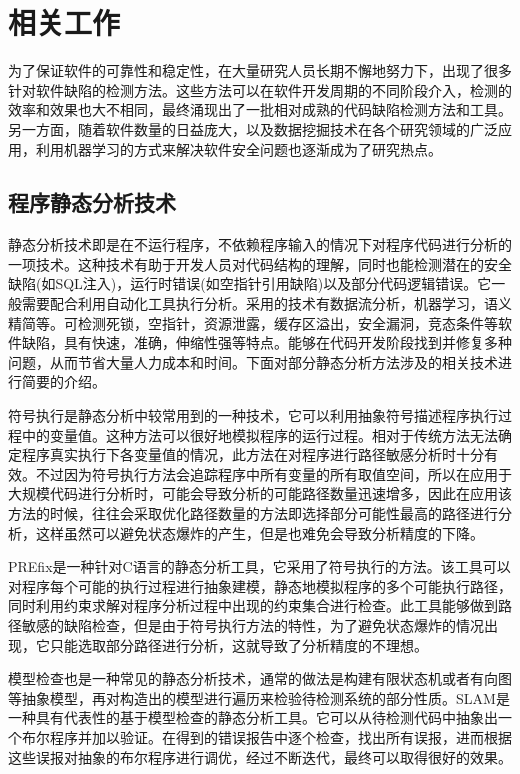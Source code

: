 \chapter{相关工作}
\label{chap:intro}

为了保证软件的可靠性和稳定性，在大量研究人员长期不懈地努力下，出现了很多针对软件缺陷的检测方法。这些方法可以在软件开发周期的不同阶段介入，检测的效率和效果也大不相同，最终涌现出了一批相对成熟的代码缺陷检测方法和工具。另一方面，随着软件数量的日益庞大，以及数据挖掘技术在各个研究领域的广泛应用，利用机器学习的方式来解决软件安全问题也逐渐成为了研究热点。

\section{程序静态分析技术}

静态分析技术即是在不运行程序，不依赖程序输入的情况下对程序代码进行分析的一项技术。这种技术有助于开发人员对代码结构的理解，同时也能检测潜在的安全缺陷(如SQL注入)，运行时错误(如空指针引用缺陷)以及部分代码逻辑错误。它一般需要配合利用自动化工具执行分析。采用的技术有数据流分析，机器学习，语义精简等。可检测死锁，空指针，资源泄露，缓存区溢出，安全漏洞，竞态条件等软件缺陷，具有快速，准确，伸缩性强等特点。能够在代码开发阶段找到并修复多种问题，从而节省大量人力成本和时间。下面对部分静态分析方法涉及的相关技术进行简要的介绍。

符号执行\cite{king1976symbolic}是静态分析中较常用到的一种技术，它可以利用抽象符号描述程序执行过程中的变量值。这种方法可以很好地模拟程序的运行过程。相对于传统方法无法确定程序真实执行下各变量值的情况，此方法在对程序进行路径敏感分析时十分有效。不过因为符号执行方法会追踪程序中所有变量的所有取值空间，所以在应用于大规模代码进行分析时，可能会导致分析的可能路径数量迅速增多，因此在应用该方法的时候，往往会采取优化路径数量的方法即选择部分可能性最高的路径进行分析，这样虽然可以避免状态爆炸的产生，但是也难免会导致分析精度的下降。

PREfix\cite{bush2000static}是一种针对C语言的静态分析工具，它采用了符号执行的方法。该工具可以对程序每个可能的执行过程进行抽象建模，静态地模拟程序的多个可能执行路径，同时利用约束求解对程序分析过程中出现的约束集合进行检查。此工具能够做到路径敏感的缺陷检查，但是由于符号执行方法的特性，为了避免状态爆炸的情况出现，它只能选取部分路径进行分析，这就导致了分析精度的不理想。

模型检查\cite{jhala2009software}也是一种常见的静态分析技术，通常的做法是构建有限状态机或者有向图等抽象模型，再对构造出的模型进行遍历来检验待检测系统的部分性质。SLAM\cite{ball2001automatically}是一种具有代表性的基于模型检查的静态分析工具。它可以从待检测代码中抽象出一个布尔程序并加以验证。在得到的错误报告中逐个检查，找出所有误报，进而根据这些误报对抽象的布尔程序进行调优，经过不断迭代，最终可以取得很好的效果。

